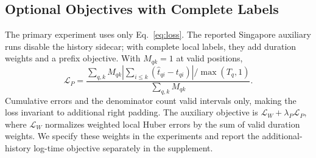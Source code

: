 \subsection{Optional Objectives with Complete Labels}
The primary experiment uses only Eq.~\eqref{eq:loss}. The reported Singapore auxiliary runs disable the history sidecar; with complete local labels, they add duration weights and a prefix objective. With $M_{qk}=1$ at valid positions,
\begin{equation}
\mathcal L_P=\frac{\sum_{q,k}M_{qk}\left|\sum_{i\leq k}(\hat t_{qi}-t_{qi})\right|/\max(T_q,1)}{\sum_{q,k}M_{qk}}.
\label{eq:prefix}
\end{equation}
Cumulative errors and the denominator count valid intervals only, making the loss invariant to additional right padding. The auxiliary objective is $\mathcal L_W+\lambda_P\mathcal L_P$, where $\mathcal L_W$ normalizes weighted local Huber errors by the sum of valid duration weights. We specify these weights in the experiments and report the additional-history log-time objective separately in the supplement.
